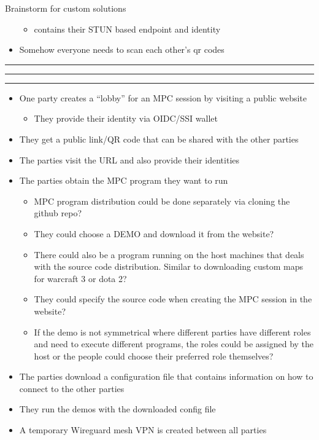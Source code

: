 \begin{frame}{Brainstorm for custom solutions}
\begin{itemize}
  \begin{itemize}
  \tightlist
  \item
    contains their STUN based endpoint and identity
  \end{itemize}
\item
  Somehow everyone needs to scan each other's qr codes
\end{itemize}

\begin{center}\rule{0.5\linewidth}{0.5pt}\end{center}

\begin{center}\rule{0.5\linewidth}{0.5pt}\end{center}

\begin{center}\rule{0.5\linewidth}{0.5pt}\end{center}

\begin{itemize}
\tightlist
\item
  One party creates a ``lobby'' for an MPC session by visiting a public website

  \begin{itemize}
  \tightlist
  \item
    They provide their identity via OIDC/SSI wallet
  \end{itemize}
\item
  They get a public link/QR code that can be shared with the other parties
\item
  The parties visit the URL and also provide their identities
\item
  The parties obtain the MPC program they want to run

  \begin{itemize}
  \tightlist
  \item
    MPC program distribution could be done separately via cloning the github repo?
  \item
    They could choose a DEMO and download it from the website?
  \item
    There could also be a program running on the host machines that deals with the source code distribution. Similar to downloading custom maps for warcraft 3 or dota 2?
  \item
    They could specify the source code when creating the MPC session in the website?
  \item
    If the demo is not symmetrical where different parties have different roles and need to execute different programs, the roles could be assigned by the host or the people could choose their preferred role themselves?
  \end{itemize}
\item
  The parties download a configuration file that contains information on how to connect to the other parties
\item
  They run the demos with the downloaded config file
\item
  A temporary Wireguard mesh VPN is created between all parties
\end{itemize}
\end{frame}

